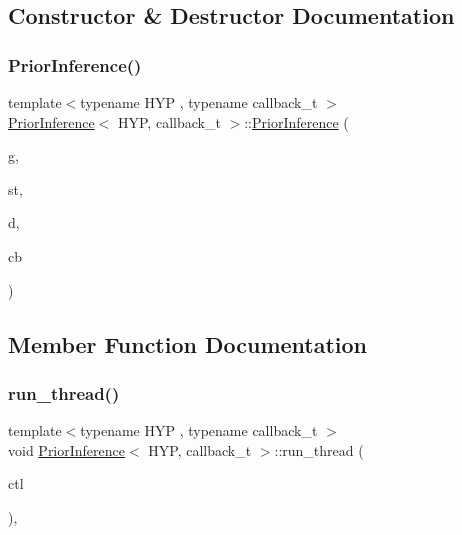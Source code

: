 \subsection{Constructor \& Destructor Documentation}
\mbox{\label{class_prior_inference_ad6ccd45888ca5616f03daed5dd0a1139}} 
\subsubsection{\texorpdfstring{Prior\+Inference()}{PriorInference()}}
{\footnotesize\ttfamily template$<$typename H\+YP , typename callback\+\_\+t $>$ \\
\hyperlink{class_prior_inference}{Prior\+Inference}$<$ H\+YP, callback\+\_\+t $>$\+::\hyperlink{class_prior_inference}{Prior\+Inference} (\begin{DoxyParamCaption}\item[{Grammar\+\_\+t $\ast$}]{g,  }\item[{\hyperlink{_nonterminal_8h_a1c5bfe9b903f69c83bbde5da7035fef3}{nonterminal\+\_\+t}}]{st,  }\item[{typename H\+Y\+P\+::data\+\_\+t $\ast$}]{d,  }\item[{callback\+\_\+t \&}]{cb }\end{DoxyParamCaption})\hspace{0.3cm}{\ttfamily [inline]}}



\subsection{Member Function Documentation}
\mbox{\label{class_prior_inference_a1c641618dffc7d3182ffdb2451500c01}} 
\subsubsection{\texorpdfstring{run\+\_\+thread()}{run\_thread()}}
{\footnotesize\ttfamily template$<$typename H\+YP , typename callback\+\_\+t $>$ \\
void \hyperlink{class_prior_inference}{Prior\+Inference}$<$ H\+YP, callback\+\_\+t $>$\+::run\+\_\+thread (\begin{DoxyParamCaption}\item[{\hyperlink{struct_control}{Control}}]{ctl }\end{DoxyParamCaption})\hspace{0.3cm}{\ttfamily [inline]}, {\ttfamily [override]}}



